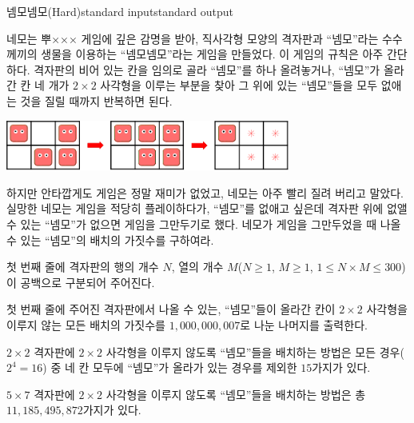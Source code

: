 \begin{problem}{넴모넴모(Hard)}{standard input}{standard output}

네모는 뿌××× 게임에 깊은 감명을 받아, 직사각형 모양의 격자판과 ``넴모''라는 수수께끼의 생물을 이용하는 ``넴모넴모''라는 게임을 만들었다. 이 게임의 규칙은 아주 간단하다. 격자판의 비어 있는 칸을 임의로 골라 ``넴모''를 하나 올려놓거나, ``넴모''가 올라간 칸 네 개가 $2 \times 2$ 사각형을 이루는 부분을 찾아 그 위에 있는 ``넴모''들을 모두 없애는 것을 질릴 때까지 반복하면 된다.

\begin{center}
  \includegraphics[width=0.7\textwidth]{nemo.png}
\end{center}

하지만 안타깝게도 게임은 정말 재미가 없었고, 네모는 아주 빨리 질려 버리고 말았다. 실망한 네모는 게임을 적당히 플레이하다가, ``넴모''를 없애고 싶은데 격자판 위에 없앨 수 있는 ``넴모''가 없으면 게임을 그만두기로 했다. 네모가 게임을 그만두었을 때 나올 수 있는 ``넴모''의 배치의 가짓수를 구하여라.

\InputFile
첫 번째 줄에 격자판의 행의 개수 $N$, 열의 개수 $M$($N \ge 1$, $M \ge 1$, $1 \le N \times M \le 300$)이 공백으로 구분되어 주어진다.

\OutputFile
첫 번째 줄에 주어진 격자판에서 나올 수 있는, ``넴모''들이 올라간 칸이 $2 \times 2$ 사각형을 이루지 않는 모든 배치의 가짓수를 $1,000,000,007$로 나눈 나머지를 출력한다.

\Example

\begin{example}
%
%
%
\end{example}

\Notes
$2 \times 2$ 격자판에 $2 \times 2$ 사각형을 이루지 않도록 ``넴모''들을 배치하는 방법은 모든 경우($2^{4}=16$) 중 네 칸 모두에 ``넴모''가 올라가 있는 경우를 제외한 $15$가지가 있다.

$5 \times 7$ 격자판에 $2 \times 2$ 사각형을 이루지 않도록 ``넴모''들을 배치하는 방법은 총 $11,185,495,872$가지가 있다.

\end{problem}
